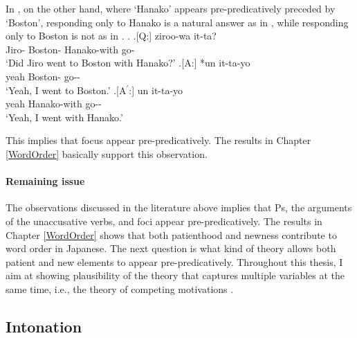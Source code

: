 In \Next,
on the other hand,
where `Hanako' appears pre-predicatively preceded by `Boston',
responding only to Hanako is a natural answer as in \Next[A$^{\prime}$],
while responding only to Boston is not as in \Next[A].
%
\ex.
 \a.[Q:] ziroo-wa   it-ta? \\
         Jiro- Boston- Hanako-with go- \\
         `Did Jiro went to Boston with Hanako?'
 \bg.[A:] *un  it-ta-yo \\
           yeah Boston- go-- \\
           `Yeah, I went to Boston.'
 \bg.[A$^{\prime}$:] un  it-ta-yo \\
           yeah Hanako-with go-- \\
           `Yeah, I went with Hanako.'
           \hfill{\cite[54]{kuno78}}

This implies that focus appear pre-predicatively.
The results in Chapter \ref{WordOrder} basically support this observation.

\paragraph{Remaining issue}

The observations discussed in the literature above implies that
Ps, the arguments of the unaccusative verbs, and foci appear pre-predicatively.
The results in Chapter \ref{WordOrder} shows that both patienthood and newness contribute to word order in Japanese.
The next question is what kind of theory allows both patient and new elements to appear pre-predicatively.
Throughout this thesis,
I aim at showing plausibility of the theory that captures multiple variables at the same time, i.e., the theory of competing motivations \cite{dubois85}.



\subsection{Intonation}\label{BackSubIntonation}

